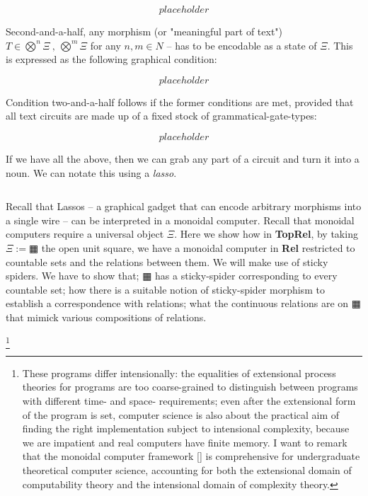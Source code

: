 \[placeholder\]

Second-and-a-half, any morphism (or "meaningful part of text") $T \in \bigotimes^n \Xi \ , \ \bigotimes^m \Xi$ for any $n,m \in N$ -- has to be encodable as a state of $\Xi$. This is expressed as the following graphical condition:

\[placeholder\]

Condition two-and-a-half follows if the former conditions are met, provided that all text circuits are made up of a fixed stock of grammatical-gate-types:

\[placeholder\]

If we have all the above, then we can grab any part of a circuit and turn it into a noun. We can notate this using a \emph{lasso}.

\[\]

Recall that Lassos -- a graphical gadget that can encode arbitrary morphisms into a single wire -- can be interpreted in a monoidal computer. Recall that monoidal computers require a universal object $\Xi$. Here we show how in \textbf{TopRel}, by taking $\Xi := \squarehvfill$ the open unit square, we have a monoidal computer in \textbf{Rel} restricted to countable sets and the relations between them. We will make use of sticky spiders. We have to show that; $\squarehvfill$ has a sticky-spider corresponding to every countable set; how there is a suitable notion of sticky-spider morphism to establish a correspondence with relations; what the continuous relations are on $\squarehvfill$ that mimick various compositions of relations.

\footnote{These programs differ intensionally: the equalities of extensional process theories for programs are too coarse-grained to distinguish between programs with different time- and space- requirements; even after the extensional form of the program is set, computer science is also about the practical aim of finding the right implementation subject to intensional complexity, because we are impatient and real computers have finite memory. I want to remark that the monoidal computer framework [] is comprehensive for undergraduate theoretical computer science, accounting for both the extensional domain of computability theory and the intensional domain of complexity theory.}




